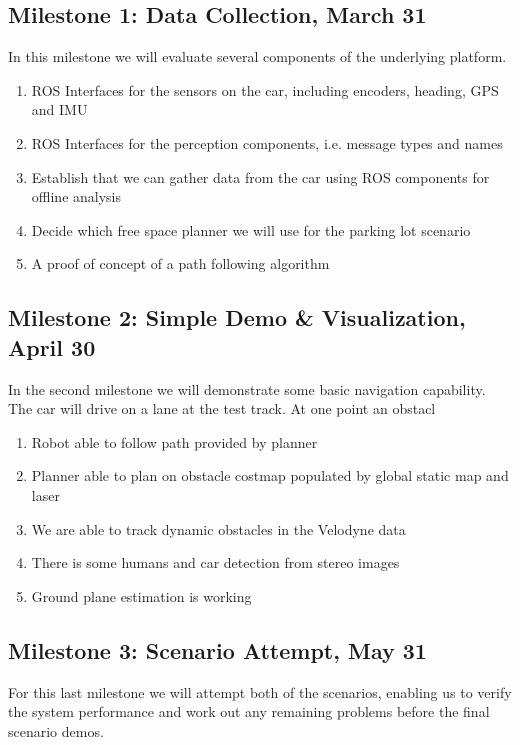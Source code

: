\documentclass[11pt,a4paper]{article}
\begin{document}
\subsection{Milestone 1: Data Collection, March 31}
\label{milestone1}

In this milestone we will evaluate several components of the underlying platform.

\begin{enumerate}
\item ROS Interfaces for the sensors on the car, including encoders, heading, GPS and IMU
\item ROS Interfaces for the perception components, i.e. message types and names
\item Establish that we can gather data from the car using ROS components for offline analysis
\item Decide which free space planner we will use for the parking lot scenario
\item A proof of concept of a path following algorithm
\end{enumerate}

\subsection{Milestone 2: Simple Demo \& Visualization, April 30}
\label{milestone2}

In the second milestone we will demonstrate some basic navigation capability.
The car will drive on a lane at the test track. At one point an
obstacl

\begin{enumerate}
\item Robot able to follow path provided by planner
\item Planner able to plan on obstacle costmap populated by global static map and laser
\item We are able to track dynamic obstacles in the Velodyne data
\item There is some humans and car detection from stereo images
\item Ground plane estimation is working
\end{enumerate}

\subsection{Milestone 3: Scenario Attempt, May 31}
\label{milestone3}

For this last milestone we will attempt both of the scenarios, enabling
us to verify the system performance and work out any remaining problems
before the final scenario demos.
\end{document}
